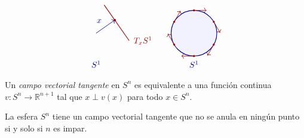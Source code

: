 \begin{nota}
\[\begin{tikzpicture}[baseline=(current bounding box.center), scale=0.92]
\begin{scope}[xshift=4.0cm]
        \draw[->, semithick, blue!55!black] (0, 0) -- (35:1.05)
            node[midway, above left=1pt] {$x$};

        \begin{scope}[shift={(35:1.05)}, rotate=35]
            \draw[thick, red!65!black] (0, 0.85) -- (0, -1.15);
            \coordinate (Tend) at (0, -1.15);
        \end{scope}

        \fill[red!65!black] (35:1.05) circle (1.5pt);
        \node[red!65!black, right=2pt] at (Tend) {$T_x S^1$};
        \node[blue!55!black] at (0, -1.42) {$S^1$};
    \end{scope}

    \begin{scope}[xshift=8.5cm]
        \filldraw[thick, blue!55!black, fill=blue!5] (0, 0) circle (1.05);

        \foreach \ang in {90, 30, -30, -90, -150, 150}{
            \begin{scope}[shift={(\ang:1.05)}, rotate=\ang]
                \draw[->, semithick, red!65!black] (0, 0) -- (0, -0.58);
                \fill[red!65!black] (0, 0) circle (1.3pt);
            \end{scope}
        }

        \node[blue!55!black] at (0, -1.42) {$S^1$};
    \end{scope}
\end{tikzpicture}
\]
\end{nota}

\begin{definicion}
Un \textit{campo vectorial tangente} en $S^n$ es equivalente a una función continua $v \colon S^n \to \mathbb{R}^{n+1}$ tal que $x \perp v(x)$ para todo $x \in S^n$.
\end{definicion}

\begin{prop}
La esfera $S^n$ tiene un campo vectorial tangente que no se anula en ningún punto si y solo si $n$ es impar.
\end{prop}


